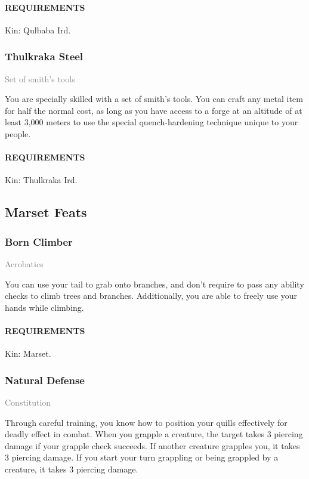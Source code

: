     \paragraph{REQUIREMENTS} Kin: Qulbaba Ird.

    \subsubsection{Thulkraka Steel} \label{feat::thulkrakasteel}
    \small{\textcolor{gray}{Set of smith's tools}}

    \normalsize
    You are specially skilled with a set of smith's tools.
    You can craft any metal item for half the normal cost, as long as you have access to a forge at an altitude of at least 3,000 meters to use the special quench-hardening technique unique to your people.
    \paragraph{REQUIREMENTS} Kin: Thulkraka Ird.

\subsection*{Marset Feats}
    \subsubsection{Born Climber} \label{feat::bornclimber}
    \small{\textcolor{gray}{Acrobatics}}

    \normalsize
    You can use your tail to grab onto branches, and don't require to pass any ability checks to climb trees and branches.
    Additionally, you are able to freely use your hands while climbing.
    \paragraph{REQUIREMENTS} Kin: Marset.

    \subsubsection{Natural Defense} \label{feat::naturaldefense}
    \small{\textcolor{gray}{Constitution}}

    \normalsize
    Through careful training, you know how to position your quills effectively for deadly effect in combat.
    When you grapple a creature, the target takes 3 piercing damage if your grapple check succeeds.
    If another creature grapples you, it takes 3 piercing damage.
    If you start your turn grappling or being grappled by a creature, it takes 3 piercing damage.
